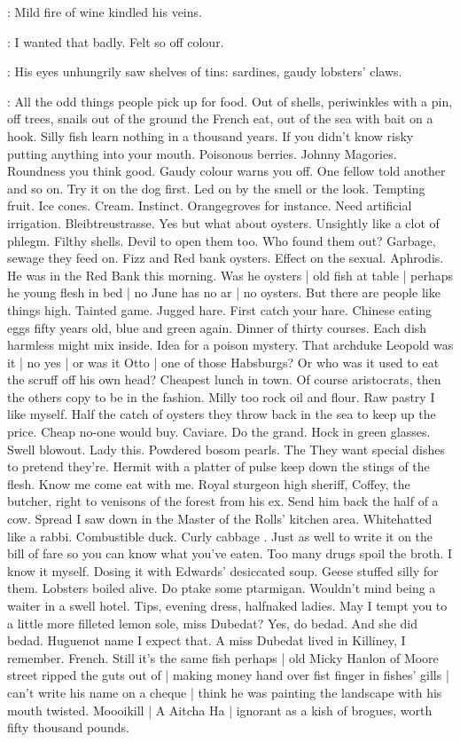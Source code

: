 :
Mild fire of wine kindled his veins.

\BloomInt:
I wanted that badly.
Felt so off colour.

:
His eyes unhungrily saw shelves of tins:
sardines, gaudy lobsters' claws.

\BloomInt:
All the odd things people pick up for food.
Out of shells,
periwinkles with a pin,
off trees,
snails out of the ground the French eat,
out of the sea with bait on a hook.
Silly fish learn nothing in a thousand years.
If you didn't know risky putting anything into your mouth.
Poisonous berries.
Johnny Magories.
Roundness you think good.
Gaudy colour warns you off.
One fellow told another and so on.
Try it on the dog first.
Led on by the smell or the look.
Tempting fruit.
Ice cones.
Cream.
Instinct.
Orangegroves for instance.
Need artificial irrigation.
Bleibtreustrasse.
Yes but what about oysters.
Unsightly like a clot of phlegm.
Filthy shells.
Devil to open them too.
Who found them out?
Garbage, sewage they feed on.
Fizz and Red bank oysters.
Effect on the sexual.
Aphrodis.
He was in the Red Bank this morning.
Was he oysters |
old fish at table |
perhaps he young flesh in bed |
no June has no ar |
no oysters.
But there are people like things high.
Tainted game.
Jugged hare.
First catch your hare.
Chinese eating eggs fifty years old,
blue and green again.
Dinner of thirty courses.
Each dish harmless might mix inside.
Idea for a poison mystery.
That archduke Leopold was it |
no yes |
or was it Otto |
one of those Habsburgs?
Or who was it used to eat the scruff off his own head?
Cheapest lunch in town.
Of course aristocrats,
then the others copy to be in the fashion.
Milly too rock oil and flour.
Raw pastry I like myself.
Half the catch of oysters they throw back in the sea to keep up the price.
Cheap no-one would buy.
Caviare.
Do the grand.
Hock in green glasses.
Swell blowout.
Lady this.
Powdered bosom pearls.
The 
They want special dishes to pretend they're.
Hermit with a platter of pulse keep down the stings of the flesh.
Know me come eat with me.
Royal sturgeon high sheriff,
Coffey, the butcher,
right to venisons of the forest from his ex.
Send him back the half of a cow.
Spread I saw down in the Master of the Rolls' kitchen area.
Whitehatted  like a rabbi.
Combustible duck.
Curly cabbage .
Just as well to write it on the bill of fare so you can know what you've eaten.
Too many drugs spoil the broth.
I know it myself.
Dosing it with Edwards' desiccated soup.
Geese stuffed silly for them.
Lobsters boiled alive.
Do ptake some ptarmigan.
Wouldn't mind being a waiter in a swell hotel.
Tips,
evening dress,
halfnaked ladies.
May I tempt you to a little more filleted lemon sole,
miss Dubedat?
Yes, do bedad.
And she did bedad.
Huguenot name I expect that.
A miss Dubedat lived in Killiney,
I remember.
 French.
Still it's the same fish perhaps |
old Micky Hanlon of Moore street ripped the guts out of |
making money hand over fist finger in fishes' gills |
can't write his name on a cheque |
think he was painting the landscape with his mouth twisted.
Moooikill |
A Aitcha Ha |
ignorant as a kish of brogues,
worth fifty thousand pounds.

